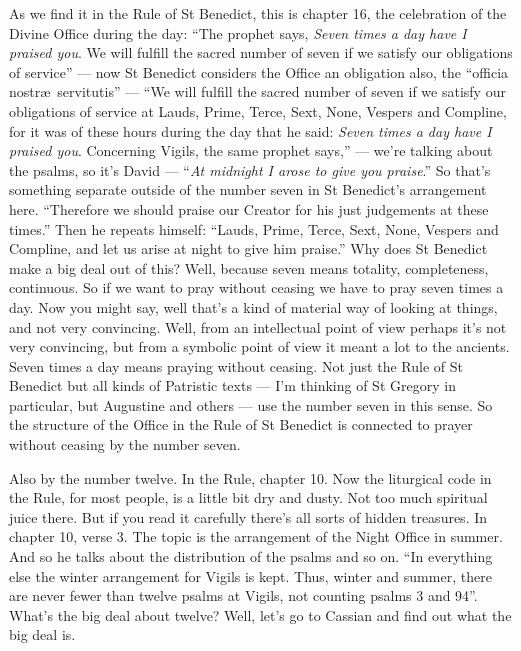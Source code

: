 As we find it in the Rule of St Benedict, this is chapter 16, the celebration of the Divine Office during the day: ``The prophet says, \emph{Seven times a day have I praised you}. We will fulfill the sacred number of seven if we satisfy our obligations of service'' --- now St Benedict considers the Office an obligation also, the ``officia nostr\ae\ servitutis'' --- ``We will fulfill the sacred number of seven if we satisfy our obligations of service at Lauds, Prime, Terce, Sext, None, Vespers and Compline, for it was of these hours during the day that he said: \emph{Seven times a day have I praised you}. Concerning Vigils, the same prophet says,'' --- we're talking about the psalms, so it's David --- ``\emph{At midnight I arose to give you praise}.'' So that's something separate outside of the number seven in St Benedict's arrangement here. ``Therefore we should praise our Creator for his just judgements at these times.'' Then he repeats himself: ``Lauds, Prime, Terce, Sext, None, Vespers and Compline, and let us arise at night to give him praise.'' Why does St Benedict make a big deal out of this? Well, because seven means totality, completeness, continuous. So if we want to pray without ceasing we have to pray seven times a day. Now you might say, well that's a kind of material way of looking at things, and not very convincing. Well, from an intellectual point of view perhaps it's not very convincing, but from a symbolic point of view it meant a lot to the ancients. Seven times a day means praying without ceasing. Not just the Rule of St Benedict but all kinds of Patristic texts --- I'm thinking of St Gregory in particular, but Augustine and others --- use the number seven in this sense. So the structure of the Office in the Rule of St Benedict is connected to prayer without ceasing by the number seven.

Also by the number twelve. In the Rule, chapter 10. Now the liturgical code in the Rule, for most people, is a little bit dry and dusty. Not too much spiritual juice there. But if you read it carefully there's all sorts of hidden treasures. In chapter 10, verse 3. The topic is the arrangement of the Night Office in summer. And so he talks about the distribution of the psalms and so on. ``In everything else the winter arrangement for Vigils is kept. Thus, winter and summer, there are never fewer than twelve psalms at Vigils, not counting psalms 3 and 94''. What's the big deal about twelve? Well, let's go to Cassian and find out what the big deal is.

